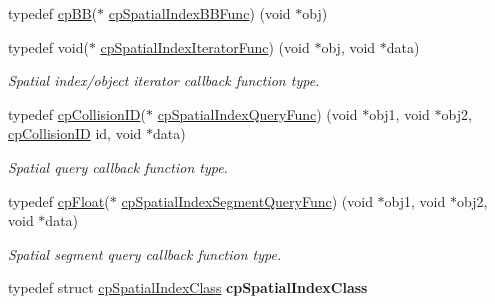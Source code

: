 \begin{DoxyCompactItemize}
\item 
typedef \mbox{\hyperlink{structcp_b_b}{cp\+BB}}($\ast$ \mbox{\hyperlink{group__cp_spatial_index_gaa8cf991cadcee1fbb6ee9379a0a6e0ea}{cp\+Spatial\+Index\+B\+B\+Func}}) (void $\ast$obj)
\item 
\mbox{\label{group__cp_spatial_index_ga522e250b59a1802d3648085685d41f97}} 
typedef void($\ast$ \mbox{\hyperlink{group__cp_spatial_index_ga522e250b59a1802d3648085685d41f97}{cp\+Spatial\+Index\+Iterator\+Func}}) (void $\ast$obj, void $\ast$data)
\begin{DoxyCompactList}\small\item\em Spatial index/object iterator callback function type. \end{DoxyCompactList}\item 
\mbox{\label{group__cp_spatial_index_ga7bcf80d017b29d32d9f8011405b241f9}} 
typedef \mbox{\hyperlink{group__basic_types_ga89d4043ca0567e947aaca19cf9600df5}{cp\+Collision\+ID}}($\ast$ \mbox{\hyperlink{group__cp_spatial_index_ga7bcf80d017b29d32d9f8011405b241f9}{cp\+Spatial\+Index\+Query\+Func}}) (void $\ast$obj1, void $\ast$obj2, \mbox{\hyperlink{group__basic_types_ga89d4043ca0567e947aaca19cf9600df5}{cp\+Collision\+ID}} id, void $\ast$data)
\begin{DoxyCompactList}\small\item\em Spatial query callback function type. \end{DoxyCompactList}\item 
\mbox{\label{group__cp_spatial_index_ga829ef5f6fd840ea31370d53db9045373}} 
typedef \mbox{\hyperlink{group__basic_types_gac1ed65573e035bf892505768c852d8d3}{cp\+Float}}($\ast$ \mbox{\hyperlink{group__cp_spatial_index_ga829ef5f6fd840ea31370d53db9045373}{cp\+Spatial\+Index\+Segment\+Query\+Func}}) (void $\ast$obj1, void $\ast$obj2, void $\ast$data)
\begin{DoxyCompactList}\small\item\em Spatial segment query callback function type. \end{DoxyCompactList}\item 
\mbox{\label{group__cp_spatial_index_ga0e6be503abc1229a5da339a30ee6f88e}} 
typedef struct \mbox{\hyperlink{structcp_spatial_index_class}{cp\+Spatial\+Index\+Class}} {\bfseries cp\+Spatial\+Index\+Class}

\end{DoxyCompactItemize}
